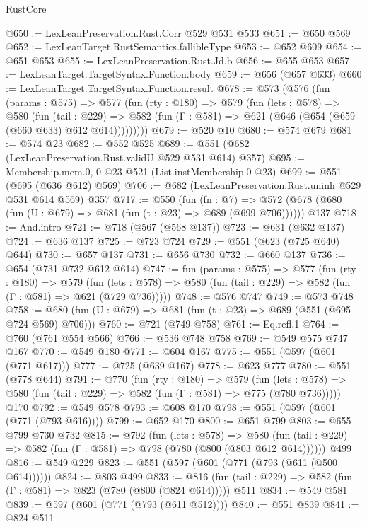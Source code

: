 \begin{lexlean}{RustCore}
\begin{coremodule}
@650 := LexLeanPreservation.Rust.Corr @529 @531 @533
@651 := @650 @569
@652 := LexLeanTarget.RustSemantics.fallibleType
@653 := @652 @609
@654 := @651 @653
@655 := LexLeanPreservation.Rust.Jd.b
@656 := @655 @653
@657 := LexLeanTarget.TargetSyntax.Function.body
@659 := @656 (@657 @633)
@660 := LexLeanTarget.TargetSyntax.Function.result
@678 := @573
    (@576
      (fun (params : @575) =>
      @577
        (fun (rty : @180) =>
        @579
          (fun (lets : @578) =>
          @580
            (fun (tail : @229) =>
            @582 (fun (Γ : @581) => @621 (@646 (@654 (@659 (@660 @633) @612 @614)))))))))
@679 := @520 @10
@680 := @574 @679
@681 := @574 @23
@682 := @552 @525
@689 := @551 (@682 (LexLeanPreservation.Rust.validU @529 @531 @614) @357)
@695 := Membership.mem.{0, 0} @23 @521 (List.instMembership.{0} @23)
@699 := @551 (@695 (@636 @612) @569)
@706 := @682 (LexLeanPreservation.Rust.uninh @529 @531 @614 @569) @357
@717 := @550
    (fun (fn : @7) =>
    @572 (@678 (@680 (fun (U : @679) => @681 (fun (t : @23) => @689 (@699 @706))))))
    @137
@718 := And.intro
@721 := @718 (@567 (@568 @137))
@723 := @631 (@632 @137)
@724 := @636 @137
@725 := @723 @724
@729 := @551 (@623 (@725 @640) @644)
@730 := @657 @137
@731 := @656 @730
@732 := @660 @137
@736 := @654 (@731 @732 @612 @614)
@747 := fun (params : @575) =>
  @577
    (fun (rty : @180) =>
    @579
      (fun (lets : @578) => @580 (fun (tail : @229) => @582 (fun (Γ : @581) => @621 (@729 @736)))))
@748 := @576 @747
@749 := @573 @748
@758 := @680 (fun (U : @679) => @681 (fun (t : @23) => @689 (@551 (@695 @724 @569) @706)))
@760 := @721 (@749 @758)
@761 := Eq.refl.{1}
@764 := @760 (@761 @554 @566)
@766 := @536 @748 @758
@769 := @549 @575 @747 @167
@770 := @549 @180
@771 := @604 @167
@775 := @551 (@597 (@601 (@771 @617)))
@777 := @725 (@639 @167)
@778 := @623 @777
@780 := @551 (@778 @644)
@791 := @770
    (fun (rty : @180) =>
    @579
      (fun (lets : @578) => @580 (fun (tail : @229) => @582 (fun (Γ : @581) => @775 (@780 @736)))))
    @170
@792 := @549 @578
@793 := @608 @170
@798 := @551 (@597 (@601 (@771 (@793 @616))))
@799 := @652 @170
@800 := @651 @799
@803 := @655 @799 @730 @732
@815 := @792
    (fun (lets : @578) =>
    @580 (fun (tail : @229) => @582 (fun (Γ : @581) => @798 (@780 (@800 (@803 @612 @614))))))
    @499
@816 := @549 @229
@823 := @551 (@597 (@601 (@771 (@793 (@611 (@500 @614))))))
@824 := @803 @499
@833 := @816 (fun (tail : @229) => @582 (fun (Γ : @581) => @823 (@780 (@800 (@824 @614))))) @511
@834 := @549 @581
@839 := @597 (@601 (@771 (@793 (@611 @512))))
@840 := @551 @839
@841 := @824 @511

\end{coremodule}
\end{lexlean}
